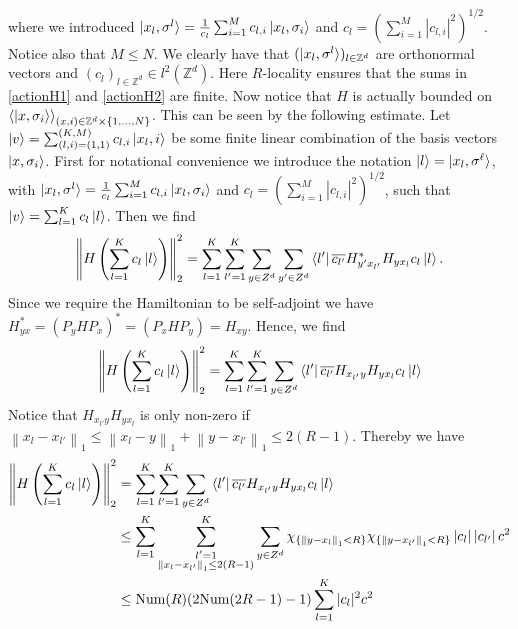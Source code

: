 \documentclass[a4paper,11pt]{article}
\newcommand{\norm}[1]{\left\lVert #1 \right\rVert}
\newcommand{\abs}[1]{\left\lvert #1 \right\rvert}
\newcommand{\Z}{\mathbb{Z}}
\numberwithin{equation}{section}
\begin{document}
 	 where we introduced $ \ket{x_l,\sigma^l}=\frac{1}{c_l}\sum_{i=1}^{M}c_{l,i}\ket{x_l,\sigma_i} $ and $ c_l=(\sum_{i=1}^{M}\abs{c_{l,i}}^2)^{1/2} $. Notice also that $ M\leq N $. We clearly have that $ (\ket{x_l,\sigma^l})_{l\in\Z^d} $ are orthonormal vectors and $ (c_l)_{l\in\Z^d}\in l^2(\Z^d) $. Here $ R $-locality ensures that the sums in \eqref{actionH1} and \eqref{actionH2} are finite. Now notice that $ H $ is actually bounded on $ \braket{\ket{x,\sigma_i}}_{(x,i)\in\Z^d\times\{1,...,N\}}  $. This can be seen by the following estimate. Let $ \ket{v}=\sum_{(l,i)=(1,1)}^{(K,M)}c_{l,i}\ket{x_l,i} $ be some finite linear combination of the basis vectors $ \ket{x,\sigma_i} $. First for notational convenience we introduce the notation $ \ket{l}=\ket{x_l,\sigma^\ell}$, with $\ket{x_l,\sigma^l}=\frac{1}{c_l}\sum_{i=1}^{M}c_{l,i}\ket{x_l,\sigma_i} $ and $ c_l=(\sum_{i=1}^{M}\abs{c_{l,i}}^2)^{1/2} $, such that $ \ket{v}=\sum_{l=1}^{K}c_l\ket{l} $. Then we find \begin{equation}
 	 \norm{H\left(\sum_{l=1}^{K}c_l\ket{l}\right)}_2^2=\sum_{l=1}^{K}\sum_{l'=1}^{K}\sum_{y\in Z^d}\sum_{y'\in Z^d}\bra{l'}\overline{c_{l'}}H_{y'x_{l'}}^*H_{yx_l}c_l\ket{l}.
 	 \end{equation}
 	 Since we require the Hamiltonian to be self-adjoint we have $ H_{yx}^*=(P_yHP_x)^*=(P_xHP_y)=H_{xy} $. Hence, we find \begin{equation}
 	  \norm{H\left(\sum_{l=1}^{K}c_l\ket{l}\right)}_2^2=\sum_{l=1}^{K}\sum_{l'=1}^{K}\sum_{y\in Z^d}\bra{l'}\overline{c_{l'}}H_{x_{l'}y}H_{yx_l}c_l\ket{l}
 	 \end{equation}
 	 Notice that $ H_{x_{l'}y}H_{yx_l} $ is only non-zero if $ \norm{x_l-x_{l'}}_1\leq\norm{x_l-y}_1+\norm{y-x_{l'}}_1\leq2(R-1) $. Thereby we have
 	 \begin{equation}
 	 \begin{aligned}
 	 \norm{H\left(\sum_{l=1}^{K}c_l\ket{l}\right)}_2^2&=\sum_{l=1}^{K}\sum_{l'=1}^{K}\sum_{y\in Z^d}\bra{l'}\overline{c_{l'}}H_{x_{l'}y}H_{yx_l}c_l\ket{l}\\&\leq\sum_{l=1}^{K}\sum_{\substack{l'=1\\\norm{x_l-x_{l'}}_1\leq2(R-1)}}^{K}\sum_{y\in Z^d}\chi_{\{\norm{y-x_l}_1<R\}}\chi_{\{\norm{y-x_{l'}}_1<R\}}\abs{c_l}\abs{c_{l'}}c^2\\&\leq \text{Num}(R)(2\text{Num}(2R-1)-1)\sum_{l=1}^{K} |c_l|^2c^2
 	 \end{aligned}
 	 \end{equation}
\end{document}
